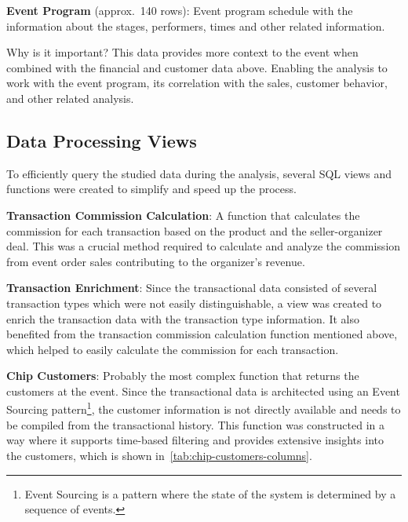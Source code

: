 \textbf{Event Program} (approx.\ 140 rows): Event program schedule with the information about the stages, performers, times and other related information.

\begin{blue-box}{Why is it important?}
	This data provides more context to the event when combined with the financial and customer data above.
	Enabling the analysis to work with the event program, its correlation with the sales, customer behavior, and other related analysis.
\end{blue-box}

\subsection{Data Processing Views}
\label{subsec:data-methodology-structure-views}
To efficiently query the studied data during the analysis, several SQL views and functions were created to simplify and speed up the process.

\textbf{Transaction Commission Calculation}: A function that calculates the commission for each transaction based on the product and the seller-organizer deal.
This was a crucial method required to calculate and analyze the commission from event order sales contributing to the organizer's revenue.

\textbf{Transaction Enrichment}: Since the transactional data consisted of several transaction types which were not easily distinguishable, a view was created to enrich the transaction data with the transaction type information.
It also benefited from the transaction commission calculation function mentioned above, which helped to easily calculate the commission for each transaction.

\textbf{Chip Customers}: Probably the most complex function that returns the customers at the event.
Since the transactional data is architected using an Event Sourcing pattern\footnote{
	Event Sourcing is a pattern where the state of the system is determined by a sequence of events\cite{aw_implementing_event_sourcing_using_a_relational_database}.
}, the customer information is not directly available and needs to be compiled from the transactional history.
This function was constructed in a way where it supports time-based filtering and provides extensive insights into the customers, which is shown in~\autoref{tab:chip-customers-columns}.

